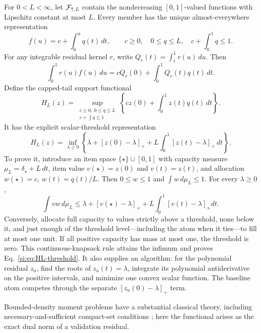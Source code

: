 For $0<L<\infty$, let $\mathcal F_{\uparrow,L}$ contain the nondecreasing $[0,1]$-valued functions with Lipschitz constant at most $L$. Every member has the unique almost-everywhere representation
\begin{equation}
f(u)=c+\int_0^u q(t)\,dt,\qquad
c\ge0,\quad0\le q\le L,\quad c+\int_0^1q\le1.
\label{si:eq:lipschitz-representation}
\end{equation}
For any integrable residual kernel $r$, write $Q_r(t)=\int_t^1r(u)\,du$. Then
\begin{equation}
\int_0^1r(u)f(u)\,du
=cQ_r(0)+\int_0^1Q_r(t)q(t)\,dt.
\label{si:eq:tail-pairing}
\end{equation}
Define the capped-tail support functional
\begin{equation}
H_L(z)=\sup_{\substack{c\ge0,\ 0\le q\le L\\c+\int q\le1}}
\left\{cz(0)+\int_0^1z(t)q(t)\,dt\right\}.
\label{si:eq:HL}
\end{equation}
It has the explicit scalar-threshold representation
\begin{equation}
\boxed{H_L(z)=\inf_{\lambda\ge0}
\left\{\lambda+[z(0)-\lambda]_+
+L\int_0^1[z(t)-\lambda]_+\,dt\right\}.}
\label{si:eq:HL-threshold}
\end{equation}
To prove it, introduce an item space $\{\star\}\cup[0,1]$ with capacity
measure $\mu_L=\delta_\star+L\,dt$, item value $v(\star)=z(0)$ and
$v(t)=z(t)$, and allocation $w(\star)=c$, $w(t)=q(t)/L$. Then
$0\le w\le1$ and $\int w\,d\mu_L\le1$. For every $\lambda\ge0$,
\begin{equation*}
\int vw\,d\mu_L
\le \lambda+[v(\star)-\lambda]_+
+L\int_0^1[v(t)-\lambda]_+dt.
\end{equation*}
Conversely, allocate full capacity to values strictly above a threshold, none
below it, and just enough of the threshold level---including the atom when it
ties---to fill at most one unit. If all positive capacity has mass at most one,
the threshold is zero. This continuous-knapsack rule attains the infimum and
proves Eq.~\ref{si:eq:HL-threshold}. It also supplies an algorithm: for the
polynomial residual $z_a$, find the roots of $z_a(t)=\lambda$, integrate its
polynomial antiderivative on the positive intervals, and minimize one convex
scalar function. The baseline atom competes through the separate
$[z_a(0)-\lambda]_+$ term.

Bounded-density moment problems have a substantial classical theory, including necessary-and-sufficient compact-set conditions \citep[Theorem~3(a--c), pp.~5--6]{lasserre2006}; here the functional arises as the exact dual norm of a validation residual.

